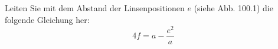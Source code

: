 \subsection{}
Leiten Sie mit dem Abstand der Linsenpositionen $e$ (siehe Abb. 100.1) die folgende
Gleichung her:
$$
4f = a - \frac{e^{2}}{a}
$$